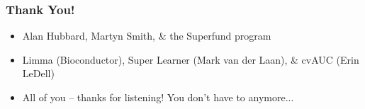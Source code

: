 \documentclass{beamer}
\begin{document}
\begin{frame}[fragile]
  	\frametitle{Thank You!}
		\begin{itemize}
			\item {Alan Hubbard, Martyn Smith, \& the Superfund program} \\
			\item {Limma (Bioconductor), Super Learner (Mark van der Laan), \& cvAUC (Erin LeDell)} \\
			\item {All of you -- thanks for listening! You don't have to anymore...}
		\end{itemize}
\end{frame}
\end{document}
